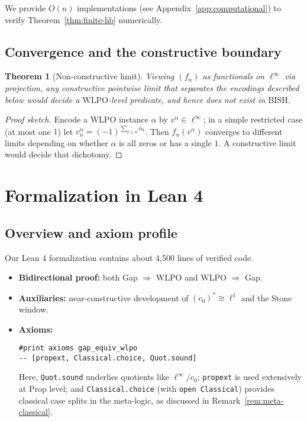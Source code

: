 \documentclass[11pt]{article}  %
\newtheorem{theorem}{Theorem}[section]
\newenvironment{thm}{\begin{theorem}}{\end{theorem}}
\newtheorem{theorem}{Theorem}[section]
\newenvironment{thm}{\begin{theorem}}{\end{theorem}}
\newcommand{\linf}{\ell^\infty}
\newcommand{\cnull}{c_0}
\newcommand{\WLPO}{\mathrm{WLPO}}
\newcommand{\BISH}{\mathrm{BISH}}
\begin{document}
We provide $O(n)$ implementations (see Appendix~\ref{app:computational}) to verify Theorem~\ref{thm:finite-hb} numerically.

\subsection{Convergence and the constructive boundary}

\begin{thm}[Non-constructive limit]
Viewing $(f_n)$ as functionals on $\linf$ via projection, any constructive pointwise limit that separates the encodings described below would decide a $\WLPO$-level predicate, and hence does not exist in $\BISH$.
\end{thm}

\begin{proof}[Proof sketch]
Encode a $\WLPO$ instance $\alpha$ by $v^\alpha\in\linf$; in a simple restricted case (at most one $1$) let $v^\alpha_n=(-1)^{\sum_{k\le n}\alpha_k}$. Then $f_n(v^\alpha)$ converges to different limits depending on whether $\alpha$ is all zeros or has a single $1$. A constructive limit would decide that dichotomy.
\end{proof}

\section{Formalization in Lean 4}\label{sec:lean}

\subsection{Overview and axiom profile}\label{sec:axioms}

Our Lean 4 formalization contains about 4{,}500 lines of verified code.
\begin{itemize}
\item \textbf{Bidirectional proof:} both Gap $\Rightarrow$ $\WLPO$ and $\WLPO$ $\Rightarrow$ Gap.
\item \textbf{Auxiliaries:} near-constructive development of $(\cnull)^*\cong \ell^1$ and the Stone window.
\item \textbf{Axioms:}
\begin{lstlisting}[language=Lean,numbers=none]
#print axioms gap_equiv_wlpo
-- [propext, Classical.choice, Quot.sound]
\end{lstlisting}
Here, \texttt{Quot.sound} underlies quotients like $\linf/\cnull$; \texttt{propext} is used extensively at Prop level; and \texttt{Classical.choice} (with \texttt{open Classical}) provides classical case splits in the meta-logic, as discussed in Remark~\ref{rem:meta-classical}.
\end{itemize}
\end{document}
